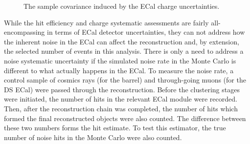 \begin{figure}%
  \centering
  \caption{The sample covariance induced by the ECal charge uncertainties.}
  \label{fig:ECalChargeCovarianceMatrices}
\end{figure}
\newline
\newline
While the hit efficiency and charge systematic assessments are fairly all-encompassing in terms of ECal detector uncertainties, they can not address how the inherent noise in the ECal can affect the reconstruction and, by extension, the selected number of events in this analysis.  There is only a need to address a noise systematic uncertainty if the simulated noise rate in the Monte Carlo is different to what actually happens in the ECal.  To measure the noise rate, a control sample  of cosmics rays (for the barrel) and through-going muons (for the DS ECal) were passed through the reconstruction.  Before the clustering stages were initiated, the number of hits in the relevant ECal module were recorded.  Then, after the reconstruction chain was completed, the number of hits which formed the final reconstructed objects were also counted.  The difference between these two numbers forms the hit estimate.  To test this estimator, the true number of noise hits in the Monte Carlo were also counted.

